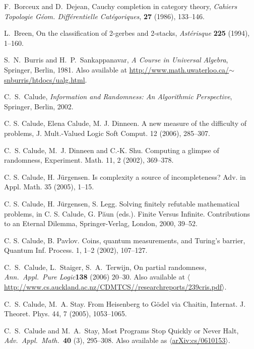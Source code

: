 \documentclass[12pt,twoside,openright]{report}
\begin{document}
\begin{thebibliography}{99}
 F.\ Borceux and D.\ Dejean, Cauchy completion in category theory, \textsl{Cahiers Topologie G\'eom. Diff\'erentielle Cat\'egoriques}, \textbf{27} (1986), 133--146.

 L.\ Breen, On the classification of 2-gerbes and 2-stacks, \textsl{Ast\'erisque} \textbf{225} (1994), 1--160.

 S.\ N.\ Burris and H.\ P.\ Sankappanavar,
{\sl A Course in Universal Algebra}, Springer, Berlin, 1981.  Also available at \href{http://www.math.uwaterloo.ca/~snburris/htdocs/ualg.html}
{http://www.math.uwaterloo.ca/$\sim$snburris/htdocs/ualg.html}.

 C.\ S.\ Calude, {\sl Information and Randomness: 
An Algorithmic Perspective}, Springer, Berlin, 2002.

C. S. Calude, Elena Calude, M. J. Dinneen. A new measure of the difficulty  of  problems,  J. Mult.-Valued Logic Soft Comput. 12 (2006), 285--307.

 C.~S. Calude, M.~J. Dinneen and C.-K. Shu. Computing a glimpse of randomness,  Experiment. Math. 11, 2 (2002), 369--378. 
 
 
 C. S. Calude, H. J{\"u}rgensen.  Is complexity a source of incompleteness? Adv.  in Appl. Math. 35 (2005), 1--15.

 C. S. Calude, H. J\"{u}rgensen, S. Legg. Solving finitely refutable mathematical problems, in C. S. Calude, G. P\u{a}un (eds.).  Finite Versus Infinite.  Contributions to an Eternal Dilemma, Springer-Verlag, London, 2000, 39--52.

 C.  S. Calude, B. Pavlov. Coins, quantum measurements, and Turing's barrier,  Quantum Inf. Process. 1, 1--2 (2002), 107--127.

 C.\ S.\ Calude, L.\ Staiger, S.\ A.\ Terwijn, On partial randomness, {\sl Ann.\ Appl.\ Pure Logic}\textbf{138} (2006)
20--30. Also available at
\href{http://www.cs.auckland.ac.nz/CDMTCS//researchreports/239cris.pdf}
{$\langle$http://www.cs.auckland.ac.nz/CDMTCS//researchreports/239cris.pdf$\rangle$}.

 C.~S. Calude, M.~A. Stay. From Heisenberg to G\"odel via Chaitin,  Internat. J. Theoret. Phys.  44, 7 (2005), 1053--1065.

 C.\ S.\ Calude and M.\ A.\ Stay, Most Programs Stop Quickly or Never Halt, 
{\sl Adv.\ Appl.\ Math.\ }\textbf{40} (3), 295--308. Also available as
\href{http://arxiv.org/abs/cs/0610153}
{$\langle$arXiv:cs/0610153$\rangle$}.


\end{thebibliography}
\end{document}
